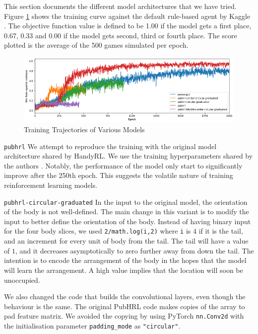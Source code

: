This section documents the different model architectures that we have tried. Figure \ref{figure_alt_arch} shows the training curve against the default rule-based agent by Kaggle \cite{repo_kaggle_environments}. The objective function value is defined to be 1.00 if the model gets a first place, 0.67, 0.33 and 0.00 if the model gets second, third or fourth place. The score plotted is the average of the 500 games simulated per epoch.

\begin{figure}[h!]
\centering
\includegraphics[width=\textwidth]{images/model-variations.png}
\caption{Training Trajectories of Various Models}
\label{figure_alt_arch}
\end{figure}


\verb|pubhrl|\newline
We attempt to reproduce the training with the original model architecture shared by HandyRL. We use the training hyperparameters shared by the authors \cite{discussion_PubHRL_parameters}.
Notably, the performance of the model only start to significantly improve after the 250th epoch. This suggests the volatile nature of training reinforcement learning models.

\verb|pubhrl-circular-graduated|\newline
In the input to the original model, the orientation of the body is not well-defined. The main change in this variant is to modify the input to better define the orientation of the body. Instead of having binary input for the four body slices, we used \verb|2/math.log(i,2)| where \verb|i| is $4$ if it is the tail, and an increment for every unit of body from the tail. The tail will have a value of $1$, and it decreases asymptotically to zero further away from down the tail. The intention is to encode the arrangement of the body in the hopes that the model will learn the arrangement. A high value implies that the location will soon be unoccupied.

We also changed the code that builds the convolutional layers, even though the behaviour is the same. The original PubHRL code makes copies of the array to pad feature matrix. We avoided the copying by using PyTorch \verb|nn.Conv2d| with the initialisation parameter \verb|padding_mode| as \verb|"circular"|.

